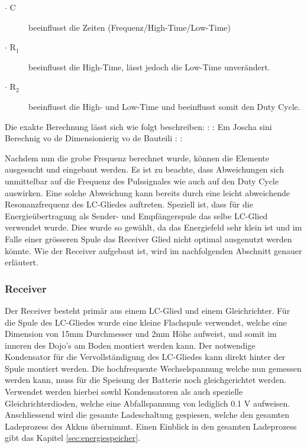\begin{description}
	\item [$\cdot$ C] beeinflusst die Zeiten (Frequenz/High-Time/Low-Time)
	\item [$\cdot$ R$_{1}$] beeinflusst die High-Time, lässt jedoch die Low-Time unverändert.
	\item [$\cdot$ R$_{2}$ ] beeinflusst die High- und Low-Time und beeinflusst somit den Duty Cycle.
\end{description}

Die exakte Berechnung lässt sich wie folgt beschreiben:
 \newline
: \newline
: \newline
Em Joscha sini Berechnig vo de Dimensionierig vo de Bauteili
 \newline
: \newline
: \newline
 \newline

Nachdem nun die grobe Frequenz berechnet wurde, können die Elemente ausgesucht und eingebaut werden. Es ist zu beachte, dass Abweichungen sich unmittelbar auf die Frequenz des Pulssignales wie auch auf den Duty Cycle auswirken. Eine solche Abweichung kann bereits durch eine leicht abweichende Resonanzfrequenz des LC-Gliedes auftreten.
\newline
Speziell ist, dass für die Energieübertragung als Sender- und Empfängerspule das selbe LC-Glied verwendet wurde. Dies wurde so gewählt, da das Energiefeld sehr klein ist und im Falle einer grösseren Spule das Receiver Glied nicht optimal ausgenutzt werden könnte. Wie der Receiver aufgebaut ist, wird im nachfolgenden Abschnitt genauer erläutert.

\subsubsection*{Receiver}
Der Receiver besteht primär aus einem LC-Glied und einem Gleichrichter. Für die Spule des LC-Gliedes wurde eine kleine Flachspule verwendet, welche eine Dimension von 15mm Durchmesser und 2mm Höhe aufweist, und somit im inneren des Dojo’s am Boden montiert werden kann. Der notwendige Kondensator für die Vervollständigung des LC-Gliedes kann direkt hinter der Spule montiert werden. Die hochfrequente Wechselspannung welche nun gemessen werden kann, muss für die Speisung der Batterie noch gleichgerichtet werden. Verwendet werden hierbei sowhl Kondensatoren als auch spezielle Gleichrichterdioden, welche eine Abfallspannung von lediglich 0.1 V aufweisen. Anschliessend wird die gesamte Ladeschaltung gespiesen, welche den gesamten Ladeprozess des Akkus übernimmt. Einen Einblick in den gesamten Ladeprozess gibt das Kapitel \ref{sec:energiespeicher}.



